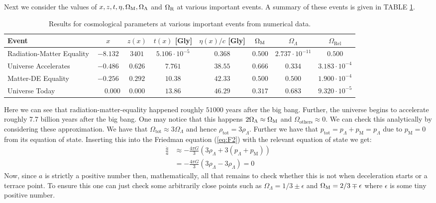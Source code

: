 \documentclass[%
reprint,
 amsmath,amssymb,
 aps,
]{revtex4-2}
\begin{document}
Next we consider the values of $x,z,t,\eta,\Omega_\text M, \Omega_\Lambda$ and $\Omega_\text R$ at various important events. A summary of these events is given in TABLE \ref{tab:cosmo_events}.
\renewcommand{\arraystretch}{1.25}
\begin{table}[ht!] %
	\caption{Results for cosmological parameters at various important events from numerical data.}
	\begin{tabular}{|l|c|c|c|c|c|c|c|}
		\hline
		Event & $x$ & $z(x)$ & $t(x)$ [Gly] & $\eta(x)/c$ [Gly] & $\Omega_\text M$ & $\Omega_{\Lambda}$ & $\Omega_{\text{Rel}}$ \\
		\hline
		Radiation-Matter Equality  & $-8.132$ & $3401$ & $5.106 \cdot 10^{-5}$ & $0.368$ & $0.500$ & $2.737 \cdot 10^{-11}$ & $0.500$ \\
		\hline
		Universe Accelerates & $-0.486$ & $0.626$ & $7.761$ & $38.55$ & $0.666$ & $0.334$ & $3.183\cdot10^{-4}$ \\
		\hline
		Matter-DE Equality & $-0.256$ & $0.292$ & $10.38$ & $42.33$ & $0.500$ & $0.500$ & $1.900\cdot10^{-4}$ \\
		\hline
		Universe Today & $\phantom{-}0.000 $ & $0.000 $ & $13.86$ & $46.29$ & $0.317$ & $0.683$ & $9.320 \cdot 10^{-5}$ \\
		\hline
	\end{tabular}
	\label{tab:cosmo_events}
\end{table}

Here we can see that radiation-matter-equality happened roughly $51000$ years after the big bang. Further, the universe begins to accelerate roughly 7.7 billion years after the big bang. One may notice that this happens $2\Omega_{\Lambda}\approx\Omega_{\text M}$ and $\Omega_{\text{others}}\approx0$. We can check this analytically by considering these approximation. We have that $\Omega_{\text{tot}}\approx3\Omega_{\Lambda}$ and hence $\rho_\text{tot}=3\rho_\Lambda$. Further we have that $p_\text{tot}=p_\Lambda+p_\text{M}=p_\Lambda$ due to $p_\text{M}=0$ from its equation of state. Inserting this into the Friedman equation (\ref{eq:F2}) with the relevant equation of state we get:
\begin{align*}
	\frac{\ddot{a}}{a}&\approx -\frac{4\pi G}{3}(3\rho_\Lambda+3(p_\Lambda+p_\text{M}))\\
	&=-\frac{4\pi G}{3}(3\rho_\Lambda-3\rho_\Lambda)=0
\end{align*}
Now, since $a$ is strictly a positive number then, mathematically, all that remains to check whether this is not when deceleration starts or a terrace point. To ensure this one can just check some arbitrarily close points such as $\Omega_{\Lambda}=1/3\pm\epsilon$ and $\Omega_{\text M}=2/3\mp\epsilon$ where $\epsilon$ is some tiny positive number.
\end{document}
